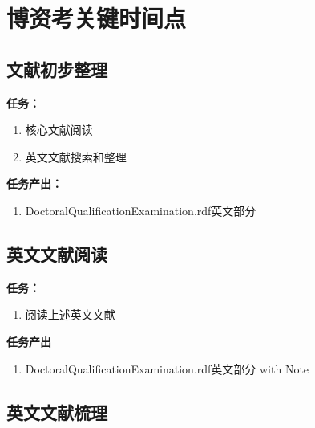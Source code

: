\documentclass[
  12pt,
]{ctexart}
\providecommand{\tightlist}{%
  \setlength{\itemsep}{0pt}\setlength{\parskip}{0pt}}
\begin{document}
\hypertarget{ux535aux8d44ux8003ux5173ux952eux65f6ux95f4ux70b9}{%
\section{博资考关键时间点}\label{ux535aux8d44ux8003ux5173ux952eux65f6ux95f4ux70b9}}

\hypertarget{ux6587ux732eux521dux6b65ux6574ux7406}{%
\subsection{文献初步整理}\label{ux6587ux732eux521dux6b65ux6574ux7406}}

\textbf{任务：}

\begin{enumerate}
\def\labelenumi{\arabic{enumi}.}
\item
  核心文献阅读
\item
  英文文献搜索和整理
\end{enumerate}

\textbf{任务产出：}

\begin{enumerate}
\def\labelenumi{\arabic{enumi}.}
\tightlist
\item
  DoctoralQualificationExamination.rdf英文部分
\end{enumerate}

\hypertarget{ux82f1ux6587ux6587ux732eux9605ux8bfb}{%
\subsection{英文文献阅读}\label{ux82f1ux6587ux6587ux732eux9605ux8bfb}}

\textbf{任务：}

\begin{enumerate}
\def\labelenumi{\arabic{enumi}.}
\tightlist
\item
  阅读上述英文文献
\end{enumerate}

\textbf{任务产出}

\begin{enumerate}
\def\labelenumi{\arabic{enumi}.}
\tightlist
\item
  DoctoralQualificationExamination.rdf英文部分 with Note
\end{enumerate}

\hypertarget{ux82f1ux6587ux6587ux732eux68b3ux7406}{%
\subsection{英文文献梳理}\label{ux82f1ux6587ux6587ux732eux68b3ux7406}}
\end{document}
